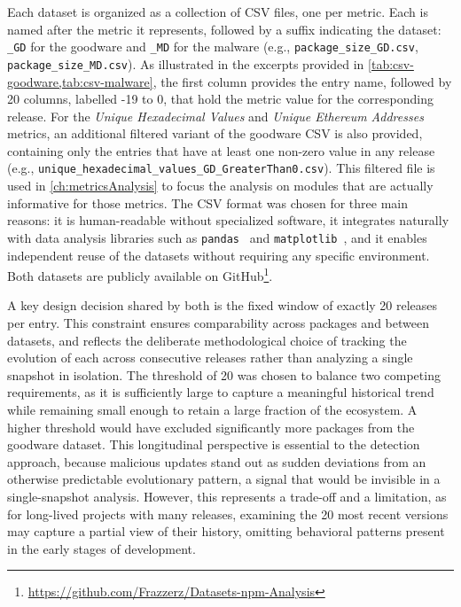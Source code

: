 Each dataset is organized as a collection of CSV files, one per metric.
Each is named after the metric it represents, followed by a suffix indicating the dataset: 
\texttt{\_GD} for the goodware and \texttt{\_MD} for the malware (e.g., \texttt{package\_size\_GD.csv}, \texttt{package\_size\_MD.csv}).
As illustrated in the excerpts provided in \cref{tab:csv-goodware,tab:csv-malware},
the first column provides the entry name,
followed by 20 columns, labelled -19 to 0, that hold the metric value for the corresponding release.
For the \emph{Unique Hexadecimal Values} and \emph{Unique Ethereum Addresses} metrics,
an additional filtered variant of the goodware CSV is also provided,
containing only the entries that have at least one non-zero value in any release 
(e.g., \texttt{unique\_hexadecimal\_values\_GD\_GreaterThan0.csv}).
This filtered file is used in \cref{ch:metricsAnalysis} to focus the analysis on modules that are actually informative for those metrics.
The CSV format was chosen for three main reasons: 
it is human-readable without specialized software, 
it integrates naturally with data analysis libraries such as \texttt{pandas}~\cite{pandas} and \texttt{matplotlib}~\cite{matplotlib},
and it enables independent reuse of the datasets without requiring any specific environment.
Both datasets are publicly available on
GitHub\footnote{\url{https://github.com/Frazzerz/Datasets-npm-Analysis}}.

A key design decision shared by both is the fixed window of exactly 20 releases per entry.
This constraint ensures comparability across packages and between datasets,
and reflects the deliberate methodological choice of tracking the evolution of each 
across consecutive releases rather than analyzing a single snapshot in isolation.
The threshold of 20 was chosen to balance two competing requirements,
as it is sufficiently large to capture a meaningful historical trend
while remaining small enough to retain a large fraction of the ecosystem.
A higher threshold would have excluded significantly more packages from the goodware dataset.
This longitudinal perspective is essential to the detection approach,
because malicious updates stand out as sudden deviations from an otherwise predictable evolutionary pattern, 
a signal that would be invisible in a single-snapshot analysis.
However, this represents a trade-off and a limitation, as for long-lived projects with many releases, 
examining the 20 most recent versions may capture a partial view of their history, 
omitting behavioral patterns present in the early stages of development.

